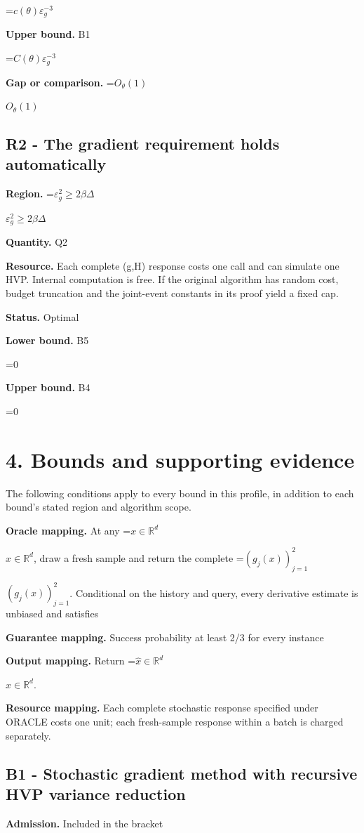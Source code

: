 \documentclass[10pt,a4paper]{article}
\newcommand{\AtlasMath}[1]{\par\begingroup\centering\setbox0=\hbox{$\displaystyle #1$}\ifdim\wd0>1.4\linewidth\typeout{ATLAS WIDE FORMULA: \the\wd0}\fi\ifdim\wd0>\linewidth\resizebox{\linewidth}{!}{\box0}\else\box0\fi\par\endgroup}
\newcommand{\AtlasInlineMath}[1]{\begingroup\setbox0=\hbox{$#1$}\ifdim\wd0>.4\linewidth\endgroup\AtlasMath{#1}\else\endgroup$#1$\fi}
\begin{document}
\AtlasMath{c(\theta)\varepsilon_g^{-3}}
\textbf{Upper bound.} B1

\AtlasMath{C(\theta)\varepsilon_g^{-3}}
\textbf{Gap or comparison.} \AtlasInlineMath{O_\theta(1)}

\subsection{R2 - The gradient requirement holds automatically}
\textbf{Region.} \AtlasInlineMath{\varepsilon_g^2\ge2\beta\Delta}

\textbf{Quantity.} Q2

\textbf{Resource.} Each complete (g,H) response costs one call and can simulate one HVP. Internal computation is free. If the original algorithm has random cost, budget truncation and the joint-event constants in its proof yield a fixed cap.

\textbf{Status.} Optimal

\textbf{Lower bound.} B5

\AtlasMath{0}
\textbf{Upper bound.} B4

\AtlasMath{0}
\section{4. Bounds and supporting evidence}
The following conditions apply to every bound in this profile, in addition to each bound's stated region and algorithm scope.

\textbf{Oracle mapping.} At any \AtlasInlineMath{x\in\mathbb{R}^d}, draw a fresh sample and return the complete \AtlasInlineMath{(g_j(x))_{j=1}^{2}}. Conditional on the history and query, every derivative estimate is unbiased and satisfies

\textbf{Guarantee mapping.} Success probability at least 2/3 for every instance

\textbf{Output mapping.} Return \AtlasInlineMath{\widehat{x}\in \mathbb{R}^d}.

\textbf{Resource mapping.} Each complete stochastic response specified under ORACLE costs one unit; each fresh-sample response within a batch is charged separately.

\subsection{B1 - Stochastic gradient method with recursive HVP variance reduction}
\textbf{Admission.} Included in the bracket
\end{document}
